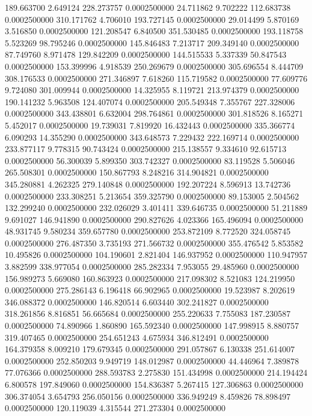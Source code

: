 189.663700 2.649124 228.273757 0.0002500000
24.711862 9.702222 112.683738 0.0002500000
310.171762 4.706010 193.727145 0.0002500000
29.014499 5.870169 3.516850 0.0002500000
121.208547 6.840500 351.530485 0.0002500000
193.118758 5.523269 98.795246 0.0002500000
145.846483 7.213717 209.349140 0.0002500000
87.749760 8.971478 129.842209 0.0002500000
144.515533 5.337339 50.847543 0.0002500000
153.399996 4.918539 250.269679 0.0002500000
305.696554 8.444709 308.176533 0.0002500000
271.346897 7.618260 115.719582 0.0002500000
77.609776 9.724080 301.009944 0.0002500000
14.325955 8.119721 213.974379 0.0002500000
190.141232 5.963508 124.407074 0.0002500000
205.549348 7.355767 227.328006 0.0002500000
343.438801 6.632004 298.764861 0.0002500000
301.818526 8.165271 5.452017 0.0002500000
19.739031 7.819920 16.432443 0.0002500000
335.366774 6.090293 14.355290 0.0002500000
343.648573 7.229432 222.169714 0.0002500000
233.877117 9.778315 90.743424 0.0002500000
215.138557 9.334610 92.615713 0.0002500000
56.300039 5.899350 303.742327 0.0002500000
83.119528 5.506046 265.508301 0.0002500000
150.867793 8.248216 314.904821 0.0002500000
345.280881 4.262325 279.140848 0.0002500000
192.207224 8.596913 13.742736 0.0002500000
233.308251 5.213654 359.325790 0.0002500000
89.153005 2.504562 132.299240 0.0002500000
232.026029 3.401411 339.646735 0.0002500000
51.211889 9.691027 146.941890 0.0002500000
290.827626 4.023366 165.496094 0.0002500000
48.931745 9.580234 359.657780 0.0002500000
253.872109 8.772520 324.058745 0.0002500000
276.487350 3.735193 271.566732 0.0002500000
355.476542 5.853582 10.495826 0.0002500000
104.190601 2.821404 146.937952 0.0002500000
110.947957 3.882599 338.977054 0.0002500000
285.282334 7.953055 29.485960 0.0002500000
156.989273 5.669080 160.863923 0.0002500000
217.098302 8.521083 124.219950 0.0002500000
275.286143 6.196418 66.902965 0.0002500000
19.523987 8.202619 346.088372 0.0002500000
146.820514 6.603440 302.241827 0.0002500000
318.261856 8.816851 56.665684 0.0002500000
255.220633 7.755083 187.230587 0.0002500000
74.890966 1.860890 165.592340 0.0002500000
147.998915 8.880757 319.407465 0.0002500000
254.651243 4.675934 346.812491 0.0002500000
164.379358 8.009210 179.679345 0.0002500000
291.057867 6.130338 251.614007 0.0002500000
252.850203 9.949719 148.012987 0.0002500000
44.446964 7.389878 77.076366 0.0002500000
288.593783 2.275830 151.434998 0.0002500000
214.194424 6.800578 197.849060 0.0002500000
154.836387 5.267415 127.306863 0.0002500000
306.374054 3.654793 256.050156 0.0002500000
336.949249 8.459826 78.898497 0.0002500000
120.119039 4.315544 271.273304 0.0002500000
